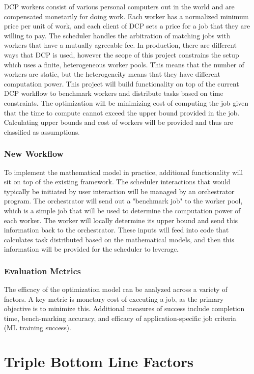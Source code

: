 \documentclass[../mthe-493-project-proposal.tex]{subfiles}
\begin{document}
    DCP workers consist of various personal computers out in the world and are compensated monetarily for doing work. Each worker has a normalized minimum price per unit of work, and each client of DCP sets a price for a job that they are willing to pay. The scheduler handles the arbitration of matching jobs with workers that have a mutually agreeable fee. In production, there are different ways that DCP is used, however the scope of this project constrains the setup which uses a finite, heterogeneous worker pools. This means that the number of workers are static, but the heterogeneity means that they have different computation power. This project will build functionality on top of the current DCP workflow to benchmark workers and distribute tasks based on time constraints. The optimization will be minimizing cost of computing the job given that the time to compute cannot exceed the upper bound provided in the job. Calculating upper bounds and cost of workers will be provided and thus are classified as assumptions.

    \subsubsection{New Workflow}

    To implement the mathematical model in practice, additional functionality will sit on top of the existing framework. The scheduler interactions that would typically be initiated by user interaction will be managed by an orchestrator program. The orchestrator will send out a "benchmark job" to the worker pool, which is a simple job that will be used to determine the computation power of each worker. The worker will locally determine its upper bound and send this information back to the orchestrator. These inputs will feed into code that calculates task distributed based on the mathematical models, and then this information will be provided for the scheduler to leverage.

    \subsubsection{Evaluation Metrics}

    The efficacy of the optimization model can be analyzed across a variety of factors. A key metric is monetary cost of executing a job, as the primary objective is to minimize this. Additional measures of success include completion time, bench-marking accuracy, and efficacy of application-specific job criteria (ML training success).

    \section{Triple Bottom Line Factors}
    \blindtext
\end{document}
